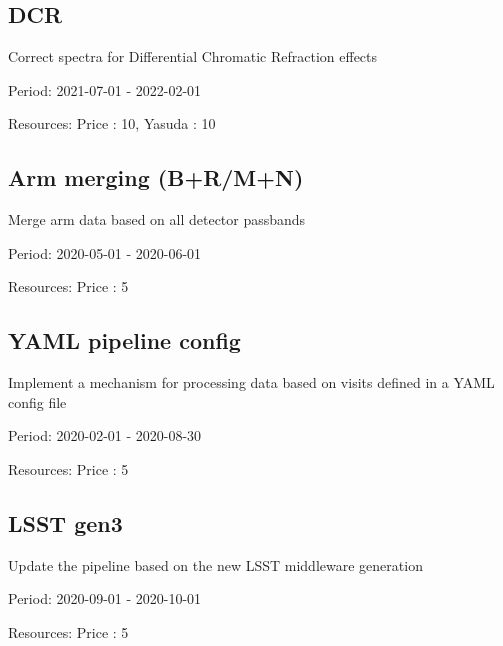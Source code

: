 \subsection{DCR}

Correct spectra for Differential Chromatic Refraction effects

Period: 2021-07-01 - 2022-02-01

Resources: Price : 10, Yasuda : 10

\subsection{Arm merging (B+R/M+N)}

Merge arm data based on all detector passbands

Period: 2020-05-01 - 2020-06-01

Resources: Price : 5

\subsection{YAML pipeline config}

Implement a mechanism for processing data based on visits defined in a YAML config file

Period: 2020-02-01 - 2020-08-30

Resources: Price : 5

\subsection{LSST gen3}

Update the pipeline based on the new LSST middleware generation

Period: 2020-09-01 - 2020-10-01

Resources: Price : 5

